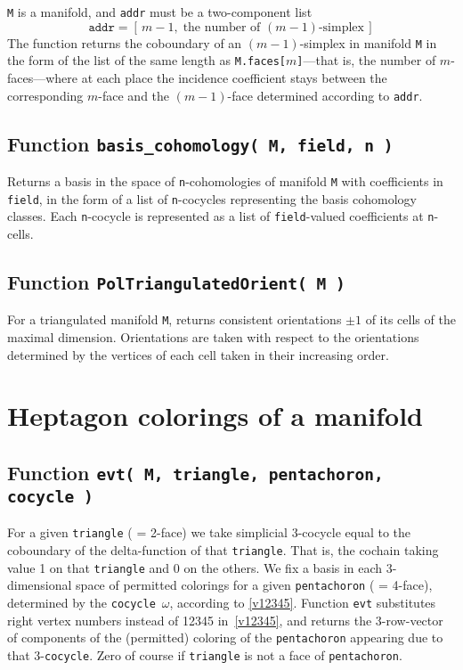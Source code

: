 \documentclass[12pt]{article}
\theoremstyle{definition}
\theoremstyle{remark}
\begin{document}
\texttt{M} is a manifold, and \texttt{addr} must be a two-component list 
\[
\texttt{addr} = [\,m-1,\; \text{the number of }(m-1)\text{-simplex}\,]
\]
The function returns the coboundary of an $(m-1)$-simplex in manifold \texttt{M} in the form of the list of the same length as \texttt{M.faces[$m$]}---that is, the number of $m$-faces---where at each place the incidence coefficient stays between the corresponding $m$-face and the $(m-1)$-face determined according to \texttt{addr}.

\subsection{Function \texttt{basis\_cohomology( M, field, n )}}

Returns a basis in the space of \texttt{n}-cohomologies of manifold \texttt{M} with coefficients in \texttt{field}, in the form of a list of \texttt{n}-cocycles representing the basis cohomology classes. Each \texttt{n}-cocycle is represented as a list of \texttt{field}-valued coefficients at \texttt{n}-cells.

\subsection{Function \texttt{PolTriangulatedOrient( M )}}

For a triangulated manifold \texttt{M}, returns consistent orientations $\pm 1$ of its cells of the maximal dimension. Orientations are taken with respect to the orientations determined by the vertices of each cell taken in their increasing order.



\section{Heptagon colorings of a manifold}\label{s:mc}

\subsection{Function \texttt{evt( M, triangle, pentachoron, cocycle )}}

For a given \texttt{triangle} ( = 2-face) we take simplicial 3-cocycle equal to the coboundary of the delta-function of that \texttt{triangle}. That is, the cochain taking value 1 on that \texttt{triangle} and 0 on the others.
We fix a basis in each 3-dimensional space of permitted colorings for a given \texttt{pentachoron} ( = 4-face), determined by the \texttt{cocycle}~$\omega$, according to \eqref{v12345}. Function \texttt{evt} substitutes right vertex numbers instead of 12345 in~\eqref{v12345}, and returns the 3-row-vector of components of the (permitted) coloring of the \texttt{pentachoron} appearing due to that 3-\texttt{cocycle}. Zero of course if \texttt{triangle} is not a face of \texttt{pentachoron}.
\end{document}

